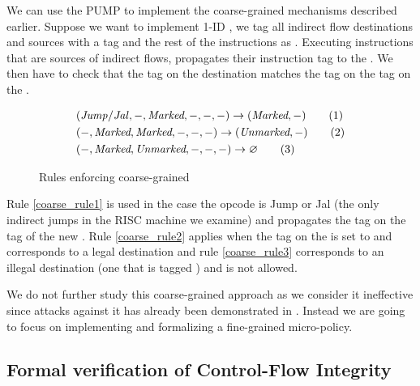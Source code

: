 
We can use the PUMP to implement the coarse-grained \CFI mechanisms described
earlier. Suppose we want to implement 1-ID \CFI, we tag all indirect flow 
destinations and sources with a tag \MARK{} and the rest of the instructions as 
\UNMARK. Executing instructions that are sources of indirect flows, propagates
their instruction tag to the \pc. We then have to check that the tag on the
destination matches the tag on the tag on the \pc.

\begin{figure}[!htpb]
\begin{align}
 & (\mathit{Jump/Jal}, -,\emph{Marked}, -, -, -) \rightarrow (\emph{Marked},-) \label{coarse_rule1} 
\tag{1} \\
 & (-, \emph{Marked}, \emph{Marked}, -, -, -) \rightarrow (\emph{Unmarked}, -) \label{coarse_rule2}
\tag{2} \\
 & (-, \emph{Marked}, \emph{Unmarked}, -, -, -) \rightarrow \varnothing \label{coarse_rule3} 
\tag{3}
\end{align}
\caption{Rules enforcing coarse-grained \CFI}
\end{figure}


Rule \ref{coarse_rule1} is used in the case the opcode is Jump or Jal (the only 
indirect jumps in the RISC machine we examine) and propagates the \MARKname tag on
the tag of the new \pc. Rule \ref{coarse_rule2} applies when the tag on the \pc
is set to \MARKname and corresponds to a legal destination and rule
\ref{coarse_rule3} corresponds to an illegal destination (\IE one that is 
tagged \UNMARK) and is not allowed.

We do not further study this coarse-grained approach as we consider it 
ineffective since attacks against it has already been demonstrated in 
\cite{outofcontrol_ieeesp2014}. Instead we are going to focus on implementing
and formalizing a fine-grained \CFI micro-policy.


\subsection{Formal verification of Control-Flow Integrity}\label{sec:cfi_verif}

